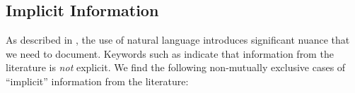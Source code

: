 

\subsection{Implicit Information}\label{imp-info}

As described in , the use of natural language introduces
significant nuance that we need to document. Keywords such as \impKeywords{}
indicate that information from the literature is \emph{not} explicit. We find
the following non-mutually exclusive cases of ``implicit'' information from the
literature:

